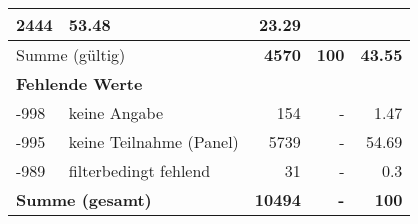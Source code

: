 \begin{longtable}{lXrrr}
       \num{2444} &
       \num[round-mode=places,round-precision=2]{53,48} &
         \num[round-mode=places,round-precision=2]{23,29} \\
     \midrule
     \multicolumn{2}{l}{Summe (gültig)} &
       \textbf{\num{4570}} &
     \textbf{100} &
       \textbf{\num[round-mode=places,round-precision=2]{43,55}} \\
     \multicolumn{5}{l}{\textbf{Fehlende Werte}}\\
       -998 &
       keine Angabe &
         \num{154} &
        - &
         \num[round-mode=places,round-precision=2]{1,47} \\
       -995 &
       keine Teilnahme (Panel) &
         \num{5739} &
        - &
         \num[round-mode=places,round-precision=2]{54,69} \\
       -989 &
       filterbedingt fehlend &
         \num{31} &
        - &
         \num[round-mode=places,round-precision=2]{0,3} \\
     \midrule
     \multicolumn{2}{l}{\textbf{Summe (gesamt)}} &
          \textbf{\num{10494}} &
        \textbf{-} &
        \textbf{100} \\
     \bottomrule
     \end{longtable}
     
